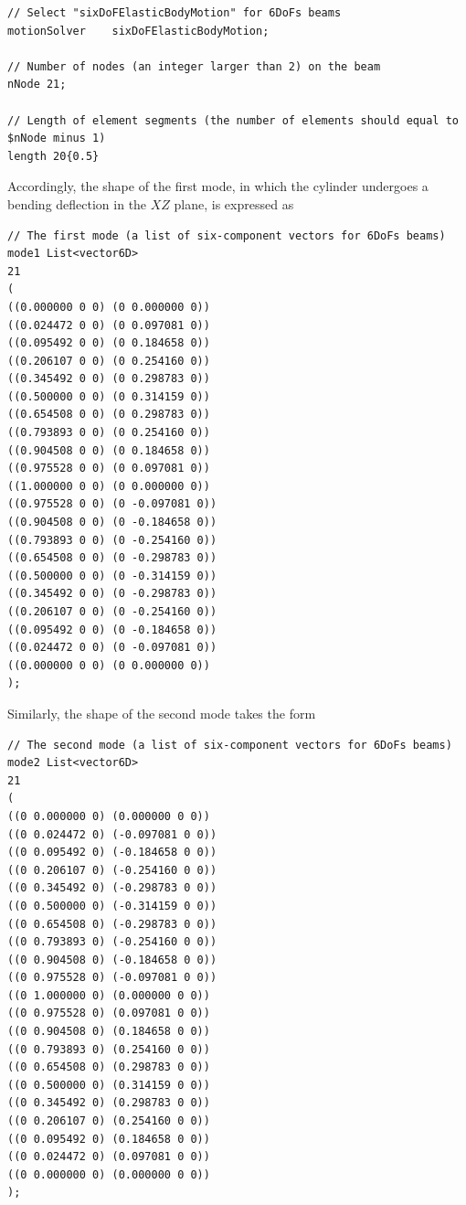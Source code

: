 \begin{lstlisting}
// Select "sixDoFElasticBodyMotion" for 6DoFs beams
motionSolver    sixDoFElasticBodyMotion;

// Number of nodes (an integer larger than 2) on the beam
nNode 21;

// Length of element segments (the number of elements should equal to $nNode minus 1)
length 20{0.5}
\end{lstlisting}

\noindent  Accordingly, the shape of the first mode, in which the cylinder undergoes a bending deflection in the $XZ$ plane, is expressed as 

\begin{lstlisting}
// The first mode (a list of six-component vectors for 6DoFs beams)
mode1 List<vector6D>
21
(
((0.000000 0 0) (0 0.000000 0))
((0.024472 0 0) (0 0.097081 0))
((0.095492 0 0) (0 0.184658 0))
((0.206107 0 0) (0 0.254160 0))
((0.345492 0 0) (0 0.298783 0))
((0.500000 0 0) (0 0.314159 0))
((0.654508 0 0) (0 0.298783 0))
((0.793893 0 0) (0 0.254160 0))
((0.904508 0 0) (0 0.184658 0))
((0.975528 0 0) (0 0.097081 0))
((1.000000 0 0) (0 0.000000 0))
((0.975528 0 0) (0 -0.097081 0))
((0.904508 0 0) (0 -0.184658 0))
((0.793893 0 0) (0 -0.254160 0))
((0.654508 0 0) (0 -0.298783 0))
((0.500000 0 0) (0 -0.314159 0))
((0.345492 0 0) (0 -0.298783 0))
((0.206107 0 0) (0 -0.254160 0))
((0.095492 0 0) (0 -0.184658 0))
((0.024472 0 0) (0 -0.097081 0))
((0.000000 0 0) (0 0.000000 0))
);
\end{lstlisting}

\noindent Similarly, the shape of the second mode takes the form

\begin{lstlisting}
// The second mode (a list of six-component vectors for 6DoFs beams)
mode2 List<vector6D>
21
(
((0 0.000000 0) (0.000000 0 0))
((0 0.024472 0) (-0.097081 0 0))
((0 0.095492 0) (-0.184658 0 0))
((0 0.206107 0) (-0.254160 0 0))
((0 0.345492 0) (-0.298783 0 0))
((0 0.500000 0) (-0.314159 0 0))
((0 0.654508 0) (-0.298783 0 0))
((0 0.793893 0) (-0.254160 0 0))
((0 0.904508 0) (-0.184658 0 0))
((0 0.975528 0) (-0.097081 0 0))
((0 1.000000 0) (0.000000 0 0))
((0 0.975528 0) (0.097081 0 0))
((0 0.904508 0) (0.184658 0 0))
((0 0.793893 0) (0.254160 0 0))
((0 0.654508 0) (0.298783 0 0))
((0 0.500000 0) (0.314159 0 0))
((0 0.345492 0) (0.298783 0 0))
((0 0.206107 0) (0.254160 0 0))
((0 0.095492 0) (0.184658 0 0))
((0 0.024472 0) (0.097081 0 0))
((0 0.000000 0) (0.000000 0 0))
);
\end{lstlisting}

